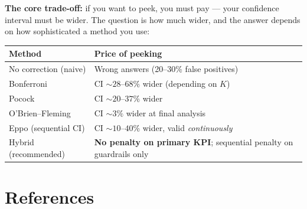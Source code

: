 \documentclass[12pt, a4paper]{article}
\begin{document}
\bigskip
\textbf{The core trade-off:} if you want to peek, you must pay --- your
confidence interval must be wider.  The question is how much wider, and the
answer depends on how sophisticated a method you use:

\begin{center}
\begin{tabular}{@{} l l @{}}
\toprule
\textbf{Method} & \textbf{Price of peeking} \\
\midrule
No correction (naive) & Wrong answers (20--30\% false positives) \\
Bonferroni & CI $\sim\!28$--$68\%$ wider (depending on $K$) \\
Pocock & CI $\sim\!20$--$37\%$ wider \\
O'Brien--Fleming & CI $\sim\!3\%$ wider at final analysis \\
Eppo (sequential CI) & CI $\sim\!10$--$40\%$ wider, valid \emph{continuously} \\
Hybrid (recommended) & \textbf{No penalty on primary KPI}; sequential
  penalty on guardrails only \\
\bottomrule
\end{tabular}
\end{center}


\newpage
\section{References}
\end{document}
